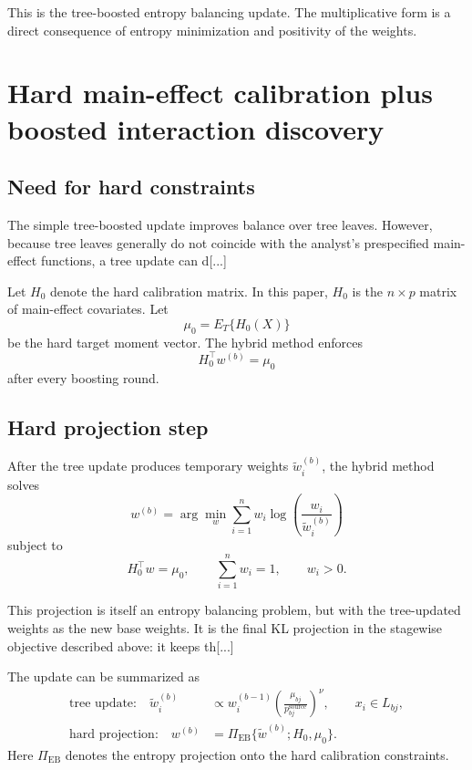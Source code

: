 \documentclass[11pt]{article}
\begin{document}
{This is the tree-boosted entropy balancing update. The multiplicative form is a direct consequence of entropy minimization and positivity of the weights.

\section{Hard main-effect calibration plus boosted interaction discovery}

\subsection{Need for hard constraints}

The simple tree-boosted update improves balance over tree leaves. However, because tree leaves generally do not coincide with the analyst's prespecified main-effect functions, a tree update can d[...]

Let $H_0$ denote the hard calibration matrix. In this paper, $H_0$ is the $n\times p$ matrix of main-effect covariates. Let
\begin{equation*}
\mu_0=E_T\{H_0(X)\}
\end{equation*}
be the hard target moment vector. The hybrid method enforces
\begin{equation*}
H_0^\top w^{(b)}=\mu_0
\end{equation*}
after every boosting round.

\subsection{Hard projection step}

After the tree update produces temporary weights $\widetilde w_i^{(b)}$, the hybrid method solves
\begin{equation*}
w^{(b)}
=
\arg\min_w
\sum_{i=1}^n w_i\log\left(\frac{w_i}{\widetilde w_i^{(b)}}\right)
\end{equation*}
subject to
\begin{equation*}
H_0^\top w=\mu_0,
\qquad
\sum_{i=1}^n w_i=1,
\qquad
w_i>0.
\end{equation*}

This projection is itself an entropy balancing problem, but with the tree-updated weights as the new base weights. It is the final KL projection in the stagewise objective described above: it keeps th[...] 

The update can be summarized as
\begin{align*}
\text{tree update:}\quad
\widetilde w_i^{(b)}
&\propto
w_i^{(b-1)}
\left(\frac{\mu_{bj}}{p_{bj}^{\mathrm{source}}}\right)^\nu,
\qquad x_i\in L_{bj},\\
\text{hard projection:}\quad
w^{(b)}
&=
\Pi_{\mathrm{EB}}\{\widetilde w^{(b)};H_0,\mu_0\}.
\end{align*}
Here $\Pi_{\mathrm{EB}}$ denotes the entropy projection onto the hard calibration constraints.

}
\end{document}
